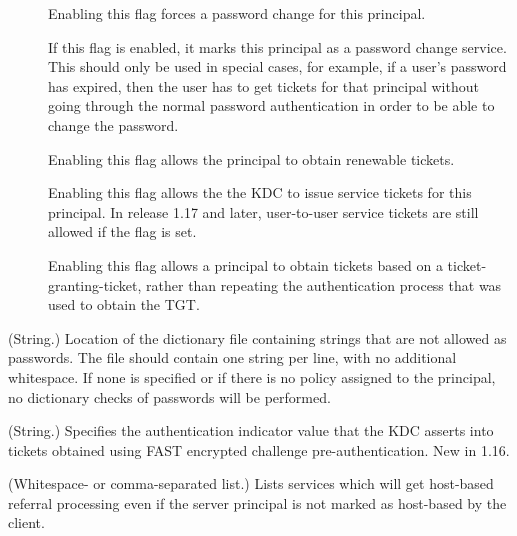 \documentclass[letterpaper,10pt,english]{sphinxmanual}
\begin{document}
\begin{description}
\begin{description}
\item[{}] \leavevmode
Enabling this flag forces a password change for this
principal.

\item[{}] \leavevmode
If this flag is enabled, it marks this principal as a password
change service.  This should only be used in special cases,
for example, if a user’s password has expired, then the user
has to get tickets for that principal without going through
the normal password authentication in order to be able to
change the password.

\item[{}] \leavevmode
Enabling this flag allows the principal to obtain renewable
tickets.

\item[{}] \leavevmode
Enabling this flag allows the the KDC to issue service tickets
for this principal.  In release 1.17 and later, user-to-user
service tickets are still allowed if the  flag is
set.

\item[{}] \leavevmode
Enabling this flag allows a principal to obtain tickets based
on a ticket-granting-ticket, rather than repeating the
authentication process that was used to obtain the TGT.

\end{description}

\item[{\sphinxstylestrong{dict\_file}}] \leavevmode
(String.)  Location of the dictionary file containing strings that
are not allowed as passwords.  The file should contain one string
per line, with no additional whitespace.  If none is specified or
if there is no policy assigned to the principal, no dictionary
checks of passwords will be performed.

\item[{\sphinxstylestrong{encrypted\_challenge\_indicator}}] \leavevmode
(String.)  Specifies the authentication indicator value that the KDC
asserts into tickets obtained using FAST encrypted challenge
pre-authentication.  New in 1.16.

\item[{\sphinxstylestrong{host\_based\_services}}] \leavevmode
(Whitespace- or comma-separated list.)  Lists services which will
get host-based referral processing even if the server principal is
not marked as host-based by the client.


\end{description}
\end{document}

